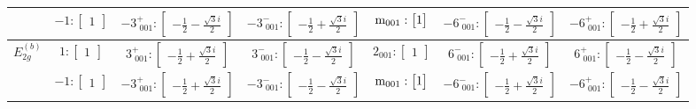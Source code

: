 \documentclass[fleqn,8pt,landscape]{jsarticle}
\begin{document}
\begin{longtable}{ccccccc}
& $ -1:\begin{bmatrix} 1 \end{bmatrix} $ & $ -3^{+}_{\,\,001}:\begin{bmatrix} - \frac{1}{2} - \frac{\sqrt{3} i}{2} \end{bmatrix} $ & $ -3^{-}_{\,\,001}:\begin{bmatrix} - \frac{1}{2} + \frac{\sqrt{3} i}{2} \end{bmatrix} $ & $ {\rm m}_{001}:\begin{bmatrix} 1 \end{bmatrix} $ & $ -6^{-}_{\,\,001}:\begin{bmatrix} - \frac{1}{2} - \frac{\sqrt{3} i}{2} \end{bmatrix} $ & $ -6^{+}_{\,\,001}:\begin{bmatrix} - \frac{1}{2} + \frac{\sqrt{3} i}{2} \end{bmatrix} $ \\ \hline
$ E_{2g}^{(b)} $ & $ 1:\begin{bmatrix} 1 \end{bmatrix} $ & $ 3^{+}_{\,\,001}:\begin{bmatrix} - \frac{1}{2} + \frac{\sqrt{3} i}{2} \end{bmatrix} $ & $ 3^{-}_{\,\,001}:\begin{bmatrix} - \frac{1}{2} - \frac{\sqrt{3} i}{2} \end{bmatrix} $ & $ 2{}_{001}:\begin{bmatrix} 1 \end{bmatrix} $ & $ 6^{-}_{\,\,001}:\begin{bmatrix} - \frac{1}{2} + \frac{\sqrt{3} i}{2} \end{bmatrix} $ & $ 6^{+}_{\,\,001}:\begin{bmatrix} - \frac{1}{2} - \frac{\sqrt{3} i}{2} \end{bmatrix} $ \\
& $ -1:\begin{bmatrix} 1 \end{bmatrix} $ & $ -3^{+}_{\,\,001}:\begin{bmatrix} - \frac{1}{2} + \frac{\sqrt{3} i}{2} \end{bmatrix} $ & $ -3^{-}_{\,\,001}:\begin{bmatrix} - \frac{1}{2} - \frac{\sqrt{3} i}{2} \end{bmatrix} $ & $ {\rm m}_{001}:\begin{bmatrix} 1 \end{bmatrix} $ & $ -6^{-}_{\,\,001}:\begin{bmatrix} - \frac{1}{2} + \frac{\sqrt{3} i}{2} \end{bmatrix} $ & $ -6^{+}_{\,\,001}:\begin{bmatrix} - \frac{1}{2} - \frac{\sqrt{3} i}{2} \end{bmatrix} $ \\ \hline

\end{longtable}
\end{document}
